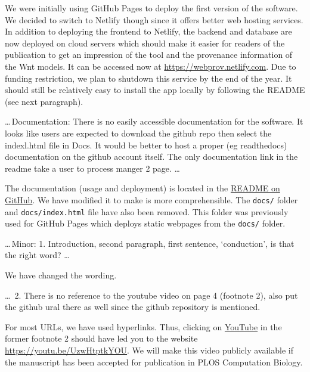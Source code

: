 \documentclass{article}
\begin{document}
We were initially using GitHub Pages to deploy the first version of the software. We decided to switch to Netlify though since it offers better web hosting services.
In addition to deploying the frontend to Netlify, the backend and database are now deployed on cloud servers which should make it easier for readers of the publication to get an impression of the tool and the provenance information of the Wnt models.
It can be accessed now at \url{https://webprov.netlify.com}.
Due to funding restriction, we plan to shutdown this service by the end of the year.
It should still be relatively easy to install the app locally by following the README (see next paragraph).


\begin{mdframed}
\ldots\,Documentation: There is no easily accessible documentation for the software. It looks like users are expected to download the github repo then select the indexl.html file in Docs. It would be better to host a proper (eg readthedocs) documentation on the github account itself. The only documentation link in the readme take a user to process manger 2 page. \ldots
\end{mdframed}


The documentation (usage and deployment) is located in the \href{https://github.com/SFB-ELAINE/WebProv#readme}{README on GitHub}.
We have modified it to make is more comprehensible.
The \texttt{docs/} folder and \texttt{docs/index.html} file have also been removed.
This folder was previously used for GitHub Pages which deploys static webpages from the \texttt{docs/} folder.

\begin{mdframed}
\ldots\,Minor:
1. Introduction, second paragraph, first sentence, ‘conduction’, is that the right word? \ldots
\end{mdframed}

We have changed the wording.

\begin{mdframed}
\ldots\, 2. There is no reference to the youtube video on page 4 (footnote 2), also put the github ural there as well since the github repository is mentioned.
\end{mdframed}

For most URLs, we have used hyperlinks.
Thus, clicking on \href{https://youtu.be/UzwHtptkYOU}{YouTube} in the former footnote 2 should have led you to the website \url{https://youtu.be/UzwHtptkYOU}.
We will make this video publicly available if the manuscript has been accepted for publication in PLOS Computation Biology.
\end{document}
